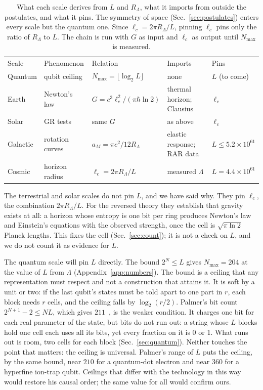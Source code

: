 \documentclass[aps,prd,twocolumn,superscriptaddress,nofootinbib,showkeys]{revtex4-2}
\newcommand{\lc}{\ell_c}
\newcommand{\RL}{R_\Lambda}
\begin{document}
\begin{table}[t]
\caption{What each scale derives from $L$ and $\RL$, what it imports from outside the postulates, and what it pins. The symmetry of space (Sec.~\ref{sec:postulates}) enters every scale but the quantum one. Since $\lc = 2\pi\RL/L$, pinning $\lc$ pins only the ratio of $\RL$ to $L$. The chain is run with $G$ as input and $\lc$ as output until $N_{\max}$ is measured.}
\label{tab:pins}
\begin{ruledtabular}
\small\setlength{\tabcolsep}{4pt}
\begin{tabular}{lllll}
Scale & Phenomenon & Relation & Imports & Pins \\
\colrule
Quantum & qubit ceiling & $N_{\max}=\lfloor\log_2L\rfloor$ & none & $L$ (to come) \\
Earth & Newton's law & $G=c^3\lc^2/(\pi\hbar\ln2)$ & thermal horizon; Clausius & $\lc$ \\
Solar & GR tests & same $G$ & as above & $\lc$ \\
Galactic & rotation curves & $a_M=\pi c^2/12\RL$ & elastic response; RAR data & $L\le5.2\!\times\!10^{61}$ \\
Cosmic & horizon radius & $\lc=2\pi\RL/L$ & measured $\Lambda$ & $L=4.4\!\times\!10^{61}$ \\
\end{tabular}
\end{ruledtabular}
\end{table}

The terrestrial and solar scales do not pin $L$, and we have said why. They pin $\lc$, the combination $2\pi\RL/L$. For the reversed theory they establish that gravity exists at all: a horizon whose entropy is one bit per ring produces Newton's law and Einstein's equations with the observed strength, once the cell is $\sqrt{\pi\ln2}$ Planck lengths. This fixes the cell (Sec.~\ref{sec:count}); it is not a check on $L$, and we do not count it as evidence for $L$.

The quantum scale will pin $L$ directly. The bound $2^N\le L$ gives $N_{\max}=204$ at the value of $L$ from $\Lambda$ (Appendix~\ref{app:numbers}). The bound is a ceiling that any representation must respect and not a construction that attains it. It is soft by a unit or two: if the last qubit's states must be told apart to one part in $r$, each block needs $r$ cells, and the ceiling falls by $\log_2(r/2)$. Palmer's bit count $2^{N+1}-2\le NL$, which gives $211$~\cite{palmer2026c}, is the weaker condition. It charges one bit for each real parameter of the state, but bits do not run out: a string whose $L$ blocks hold one cell each uses all its bits, yet every fraction on it is 0 or 1. What runs out is room, two cells for each block (Sec.~\ref{sec:quantum}). Neither touches the point that matters: the ceiling is universal. Palmer's range of $L$ puts the ceiling, by the same bound, near $210$ for a quantum-dot electron and near $360$ for a hyperfine ion-trap qubit. Ceilings that differ with the technology in this way would restore his causal order; the same value for all would confirm ours.
\end{document}

